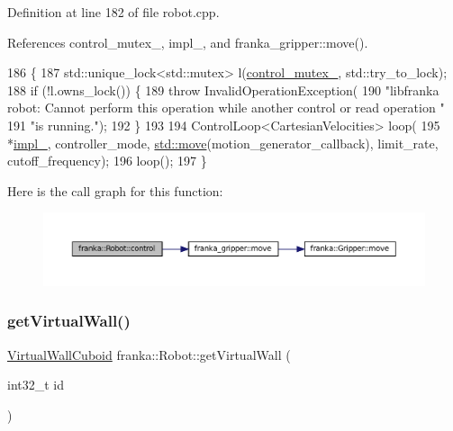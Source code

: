 Definition at line 182 of file robot.\+cpp.



References control\+\_\+mutex\+\_\+, impl\+\_\+, and franka\+\_\+gripper\+::move().


\begin{DoxyCode}
186                                              \{
187   std::unique\_lock<std::mutex> l(\hyperlink{classfranka_1_1Robot_a719ad1fab76f8edfc9f6f761671c1375}{control\_mutex\_}, std::try\_to\_lock);
188   \textcolor{keywordflow}{if} (!l.owns\_lock()) \{
189     \textcolor{keywordflow}{throw} InvalidOperationException(
190         \textcolor{stringliteral}{"libfranka robot: Cannot perform this operation while another control or read operation "}
191         \textcolor{stringliteral}{"is running."});
192   \}
193 
194   ControlLoop<CartesianVelocities> loop(
195       *\hyperlink{classfranka_1_1Robot_aca155054184e5b6478942fd6a1b82ba4}{impl\_}, controller\_mode, \hyperlink{namespacefranka__gripper_a1356a87108d2229401d3755bd3e53bdf}{std::move}(motion\_generator\_callback), limit\_rate, 
      cutoff\_frequency);
196   loop();
197 \}
\end{DoxyCode}
Here is the call graph for this function\+:
\nopagebreak
\begin{figure}[H]
\begin{center}
\leavevmode
\includegraphics[width=350pt]{classfranka_1_1Robot_a5d39a89a41edee89a776c3491dd20738_cgraph}
\end{center}
\end{figure}
\mbox{\label{classfranka_1_1Robot_a1739f6dc13f0c33b3213375323c93399}} 
\subsubsection{\texorpdfstring{get\+Virtual\+Wall()}{getVirtualWall()}}
{\footnotesize\ttfamily \hyperlink{structfranka_1_1VirtualWallCuboid}{Virtual\+Wall\+Cuboid} franka\+::\+Robot\+::get\+Virtual\+Wall (\begin{DoxyParamCaption}\item[{int32\+\_\+t}]{id }\end{DoxyParamCaption})}

